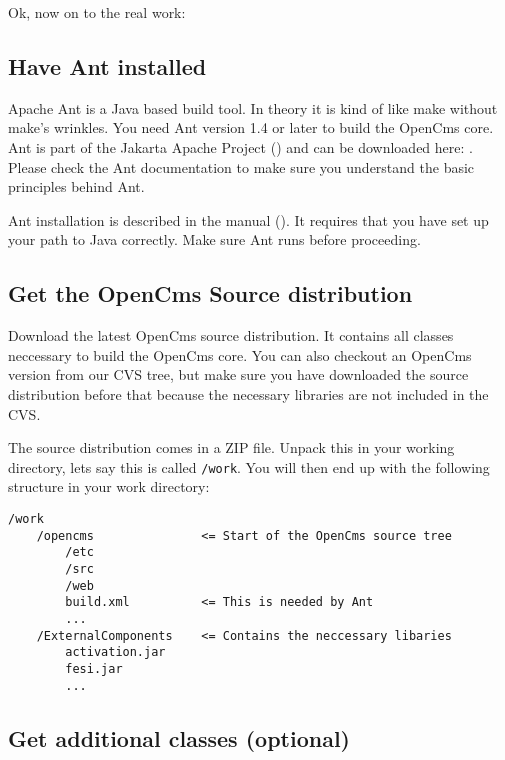 Ok, now on to the real work:

\subsection{Have Ant installed}

Apache Ant is a Java based build tool. In theory it is kind of like make
without make's wrinkles. You need Ant version 1.4 or later to build the 
OpenCms core. Ant is part of the Jakarta Apache Project 
() and can be downloaded
here: . 
Please check the Ant documentation to make sure you understand the basic 
principles behind Ant. 

Ant installation is described in the manual
(). 
It requires that you have set up your path to Java correctly. Make sure 
Ant runs before proceeding.

\subsection{Get the OpenCms Source distribution}

Download the latest OpenCms source distribution. It contains all classes 
neccessary to build the OpenCms core. You can also checkout an OpenCms version
from our CVS tree, but make sure you have downloaded the source distribution 
before that because the necessary libraries are not included in the CVS. 

The source distribution comes in a ZIP file. Unpack this in your working 
directory, lets say this is called \texttt{/work}. You will then end up with the 
following structure in your work directory:

\begin{verbatim}
/work
    /opencms               <= Start of the OpenCms source tree
        /etc
        /src
        /web
        build.xml          <= This is needed by Ant 
        ...  
    /ExternalComponents    <= Contains the neccessary libaries
        activation.jar
        fesi.jar
        ...
\end{verbatim}


\subsection{Get additional classes (optional)}

